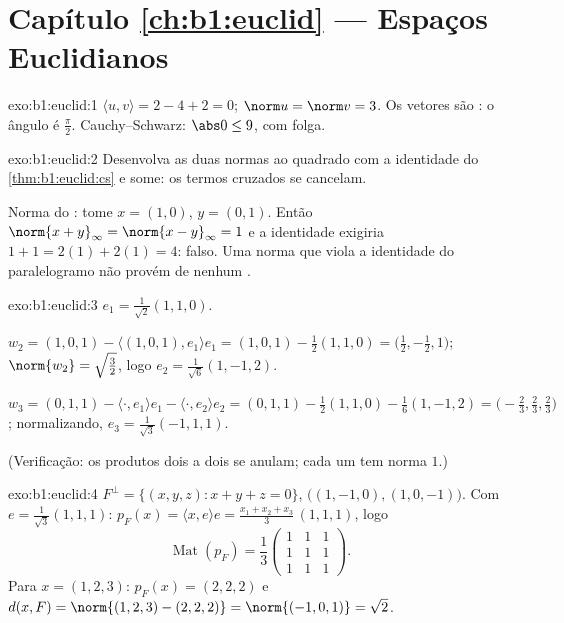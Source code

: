 \section*{Capítulo \ref{ch:b1:euclid} --- Espaços Euclidianos}

\begin{solution}{exo:b1:euclid:1}
$\langle u, v\rangle = 2 - 4 + 2 = 0$; $\norm u = \norm v = 3$. Os vetores são : o ângulo é $\frac\pi2$.
Cauchy--Schwarz: $\abs 0 \leq 9$, com folga.
\end{solution}

\begin{solution}{exo:b1:euclid:2}
Desenvolva as duas normas ao quadrado com a identidade do \cref{thm:b1:euclid:cs} e
some: os termos cruzados se cancelam.

Norma do : tome $x = (1, 0)$, $y = (0, 1)$. Então $\norm{x + y}_\infty
= \norm{x - y}_\infty = 1$ e a identidade
exigiria $1 + 1 =
2(1) + 2(1) = 4$: falso. Uma norma que viola a identidade do
paralelogramo não provém de nenhum .
\end{solution}

\begin{solution}{exo:b1:euclid:3}
$e_1 = \frac{1}{\sqrt 2}(1,1,0)$.

$w_2 = (1,0,1) - \langle (1,0,1), e_1\rangle e_1 = (1,0,1) -
\frac{1}{2}(1,1,0) = \bigl(\tfrac12, -\tfrac12, 1\bigr)$; $\norm{w_2} = \sqrt{\tfrac32}$, logo $e_2 =
\frac{1}{\sqrt 6}(1, -1, 2)$.

$w_3 = (0,1,1) - \langle\cdot, e_1\rangle e_1 - \langle\cdot,
e_2\rangle e_2 = (0,1,1) - \frac12 (1,1,0) - \frac16(1,-1,2) =
\bigl(-\tfrac23, \tfrac23, \tfrac23\bigr)$; normalizando, $e_3 =
\frac{1}{\sqrt 3}(-1, 1, 1)$.

(Verificação: os produtos dois a dois se anulam; cada um tem norma
$1$.)
\end{solution}

\begin{solution}{exo:b1:euclid:4}
$F^\perp = \{(x,y,z) : x + y + z = 0\}$,  $\bigl((1,-1,0),
(1,0,-1)\bigr)$. Com $e = \frac{1}{\sqrt3}(1,1,1)$: $p_F(x) =
\langle x, e\rangle e = \frac{x_1 + x_2 + x_3}{3}\,(1,1,1)$, logo
\[
\operatorname{Mat}(p_F) = \frac13
\begin{pmatrix} 1&1&1\\ 1&1&1\\ 1&1&1\end{pmatrix}.
\]
Para $x = (1,2,3)$: $p_F(x) = (2,2,2)$ e $d(x, F) = \norm{(1,2,3)
- (2,2,2)} = \norm{(-1,0,1)} = \sqrt 2$.
\end{solution}

